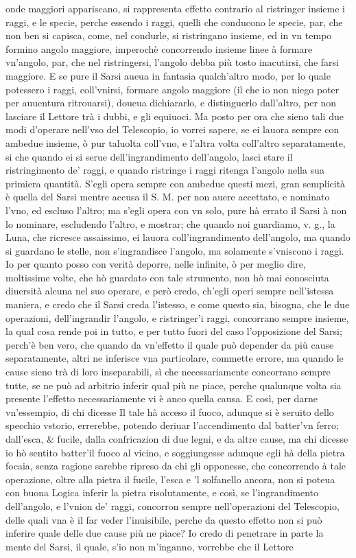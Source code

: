 \documentclass[11pt,twoside,openany]{book}
\begin{document}
onde maggiori appariscano, si rappresenta effetto contrario al ristringer insieme i raggi, e le specie, perche essendo i raggi, quelli che conducono le specie, par, che non ben si capisca, come, nel condurle, si ristringano insieme, ed in vn tempo formino angolo maggiore, imperochè concorrendo insieme linee à formare vn'angolo, par, che nel ristringersi, l'angolo debba più tosto inacutirsi, che farsi maggiore. E se pure il Sarsi aueua in fantasia qualch'altro modo, per lo quale potessero i raggi, coll'vnirsi, formare angolo maggiore (il che io non niego poter per auuentura ritrouarsi), doueua dichiararlo, e distinguerlo dall'altro, per non lasciare il Lettore trà i dubbi, e gli equiuoci. Ma posto per ora che sieno tali due modi d'operare nell'vso del Telescopio, io vorrei sapere, se ei lauora sempre con ambedue insieme, ò pur taluolta coll'vno, e l'altra volta coll'altro separatamente, si che quando ei si serue dell'ingrandimento dell'angolo, lasci stare il ristringimento de' raggi, e quando ristringe i raggi ritenga l'angolo nella sua primiera quantità. S'egli opera sempre con ambedue questi mezi, gran semplicità è quella del Sarsi mentre accusa il S. M. per non auere accettato, e nominato l'vno, ed escluso l'altro; ma s'egli opera con vn solo, pure hà errato il Sarsi à non lo nominare, escludendo l'altro, e mostrar; che quando noi guardiamo, v. g., la Luna, che ricresce assaissimo, ei lauora coll'ingrandimento dell'angolo, ma quando si guardano le stelle, non s'ingrandisce l'angolo, ma solamente s'vniscono i raggi. Io per quanto posso con verità deporre, nelle infinite, ò per meglio dire, moltissime volte, che hò guardato con tale strumento, non hò mai conosciuta diuersità alcuna nel suo operare, e però credo, ch'egli operi sempre nell'istessa maniera, e credo che il Sarsi creda l'istesso, e come questo sia, bisogna, che le due operazioni, dell'ingrandir l'angolo, e ristringer'i raggi, concorrano sempre insieme, la qual cosa rende poi in tutto, e per tutto fuori del caso l'opposizione del Sarsi; perch'è ben vero, che quando da vn'effetto il quale può depender da più cause separatamente, altri ne inferisce vna particolare, commette errore, ma quando le cause sieno trà di loro inseparabili, sì che necessariamente concorrano sempre tutte, se ne può ad arbitrio inferir qual più ne piace, perche qualunque volta sia presente l'effetto necessariamente vi è anco quella causa. E così, per darne vn'essempio, di chi dicesse Il tale hà acceso il fuoco, adunque si è seruito dello specchio vstorio, errerebbe, potendo deriuar l'accendimento dal batter'vn ferro; dall'esca, \& fucile, dalla confricazion di due legni, e da altre cause, ma chi dicesse io hò sentito batter'il fuoco al vicino, e soggiungesse adunque egli hà della pietra focaia, senza ragione sarebbe ripreso da chi gli opponesse, che concorrendo à tale operazione, oltre alla pietra il fucile, l'esca e 'l solfanello ancora, non si poteua con buona Logica inferir la pietra risolutamente, e così, se l'ingrandimento dell'angolo, e l'vnion de' raggi, concorron sempre nell'operazioni del Telescopio, delle quali vna è il far veder l'inuisibile, perche da questo effetto non si può inferire quale delle due cause più ne piace? Io credo di penetrare in parte la mente del Sarsi, il quale, s'io non m'inganno, vorrebbe che il Lettore 
\end{document}
